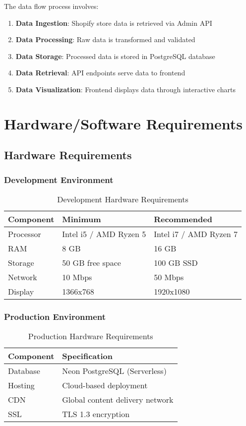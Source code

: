 \documentclass[12pt]{article}
\begin{document}
The data flow process involves:
\begin{enumerate}
    \item \textbf{Data Ingestion}: Shopify store data is retrieved via Admin API
    \item \textbf{Data Processing}: Raw data is transformed and validated
    \item \textbf{Data Storage}: Processed data is stored in PostgreSQL database
    \item \textbf{Data Retrieval}: API endpoints serve data to frontend
    \item \textbf{Data Visualization}: Frontend displays data through interactive charts
\end{enumerate}

\section{Hardware/Software Requirements}

\subsection{Hardware Requirements}

\subsubsection{Development Environment}
\begin{table}[H]
\centering
\begin{tabular}{|l|l|l|}
\hline
\textbf{Component} & \textbf{Minimum} & \textbf{Recommended} \\
\hline
Processor & Intel i5 / AMD Ryzen 5 & Intel i7 / AMD Ryzen 7 \\
RAM & 8 GB & 16 GB \\
Storage & 50 GB free space & 100 GB SSD \\
Network & 10 Mbps & 50 Mbps \\
Display & 1366x768 & 1920x1080 \\
\hline
\end{tabular}
\caption{Development Hardware Requirements}
\label{tab:dev_hardware}
\end{table}

\subsubsection{Production Environment}
\begin{table}[H]
\centering
\begin{tabular}{|l|l|}
\hline
\textbf{Component} & \textbf{Specification} \\
\hline
Database & Neon PostgreSQL (Serverless) \\
Hosting & Cloud-based deployment \\
CDN & Global content delivery network \\
SSL & TLS 1.3 encryption \\
\hline
\end{tabular}
\caption{Production Hardware Requirements}
\label{tab:prod_hardware}
\end{table}
\end{document}
